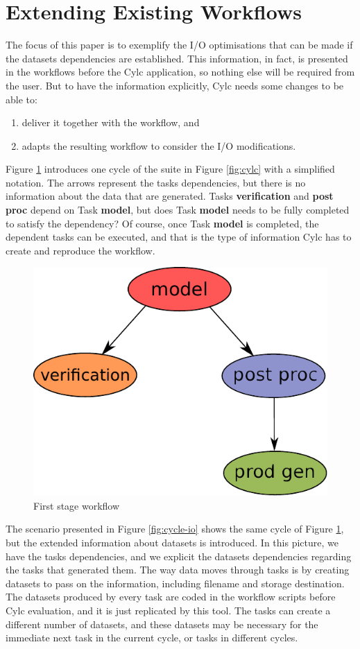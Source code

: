 \documentclass[a4paper]{article}
\begin{document}
\section{Extending Existing Workflows}

The focus of this paper is to exemplify the I/O optimisations that can be made if the datasets dependencies are established. This information, in fact, is presented in the workflows before the Cylc application, so nothing else will be required from the user. But to have the information explicitly, Cylc needs some changes to be able to:

\begin{enumerate}

\item deliver it together with the workflow, and

\item adapts the resulting workflow to consider the I/O modifications.

\end{enumerate}

Figure \ref{fig:cycle1} introduces one cycle of the suite in Figure \ref{fig:cylc} with a simplified notation. The arrows represent the tasks dependencies, but there is no information about the data that are generated. Tasks \textbf{verification} and \textbf{post\,proc} depend on Task \textbf{model}, but does Task \textbf{model} needs to be fully completed to satisfy the dependency? Of course, once Task \textbf{model} is completed, the dependent tasks can be executed, and that is the type of information Cylc has to create and reproduce the workflow.

\begin{figure}[H]
  \centering
  \includegraphics[width=0.4\columnwidth]{cycle1}
  \caption{First stage workflow}
  \label{fig:cycle1}
\end{figure}

The scenario presented in Figure \ref{fig:cycle-io} shows the same cycle of Figure \ref{fig:cycle1}, but the extended information about datasets is introduced.
In this picture, we have the tasks dependencies, and we explicit the datasets dependencies regarding the tasks that generated them.
The way data moves through tasks is by creating datasets to pass on the information, including filename and storage destination. The datasets produced by every task are coded in the workflow scripts before Cylc evaluation, and it is just replicated by this tool. The tasks can create a different number of datasets, and these datasets may be necessary for the immediate next task in the current cycle, or tasks in different cycles.
\end{document}
